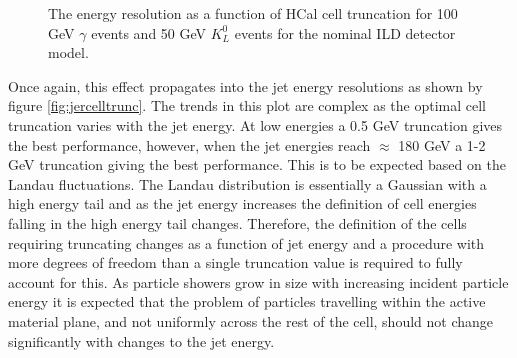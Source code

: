 \begin{figure}
\caption[The energy resolution as a function of HCal cell truncation for \protect{} 100 GeV $\gamma$ events and \protect{} 50 GeV $K^{0}_{L}$ events for the nominal ILD detector model.]{The energy resolution as a function of HCal cell truncation for \protect{} 100 GeV $\gamma$ events and \protect{} 50 GeV $K^{0}_{L}$ events for the nominal ILD detector model.}
\label{fig:ercelltrunc}
\end{figure}

Once again, this effect propagates into the jet energy resolutions as shown by figure \ref{fig:jercelltrunc}.  The trends in this plot are complex as the optimal cell truncation varies with the jet energy.  At low energies a 0.5 GeV truncation gives the best performance, however, when the jet energies reach $\approx$ 180 GeV a 1-2 GeV truncation giving the best performance.  This is to be expected based on the Landau fluctuations.  The Landau distribution is essentially a Gaussian with a high energy tail and as the jet energy increases the definition of cell energies falling in the high energy tail changes.  Therefore, the definition of the cells requiring truncating changes as a function of jet energy and a procedure with more degrees of freedom than a single truncation value is required to fully account for this.  As particle showers grow in size with increasing incident particle energy it is expected that the problem of particles travelling within the active material plane, and not uniformly across the rest of the cell, should not change significantly with changes to the jet energy.  

